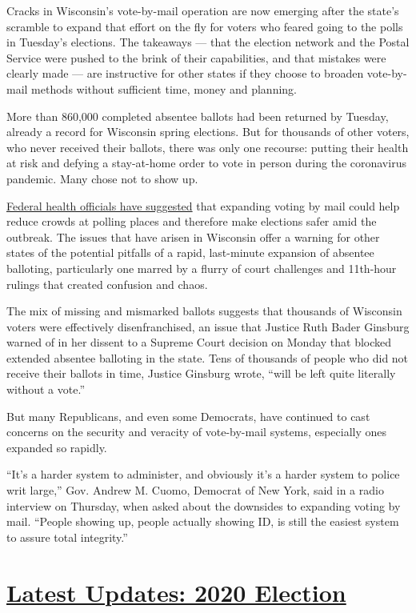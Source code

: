 Cracks in Wisconsin's vote-by-mail operation are now emerging after the
state's scramble to expand that effort on the fly for voters who feared
going to the polls in Tuesday's elections. The takeaways --- that the
election network and the Postal Service were pushed to the brink of
their capabilities, and that mistakes were clearly made --- are
instructive for other states if they choose to broaden vote-by-mail
methods without sufficient time, money and planning.

More than 860,000 completed absentee ballots had been returned by
Tuesday, already a record for Wisconsin spring elections. But for
thousands of other voters, who never received their ballots, there was
only one recourse: putting their health at risk and defying a
stay-at-home order to vote in person during the coronavirus pandemic.
Many chose not to show up.

\href{https://www.nytimes3xbfgragh.onion/2020/04/08/us/politics/republicans-vote-by-mail.html}{Federal
health officials have suggested} that expanding voting by mail could
help reduce crowds at polling places and therefore make elections safer
amid the outbreak. The issues that have arisen in Wisconsin offer a
warning for other states of the potential pitfalls of a rapid,
last-minute expansion of absentee balloting, particularly one marred by
a flurry of court challenges and 11th-hour rulings that created
confusion and chaos.

The mix of missing and mismarked ballots suggests that thousands of
Wisconsin voters were effectively disenfranchised, an issue that Justice
Ruth Bader Ginsburg warned of in her dissent to a Supreme Court decision
on Monday that blocked extended absentee balloting in the state. Tens of
thousands of people who did not receive their ballots in time, Justice
Ginsburg wrote, ``will be left quite literally without a vote.''

But many Republicans, and even some Democrats, have continued to cast
concerns on the security and veracity of vote-by-mail systems,
especially ones expanded so rapidly.

``It's a harder system to administer, and obviously it's a harder system
to police writ large,'' Gov. Andrew M. Cuomo, Democrat of New York, said
in a radio interview on Thursday, when asked about the downsides to
expanding voting by mail. ``People showing up, people actually showing
ID, is still the easiest system to assure total integrity.''

\hypertarget{latest-updates-2020-election}{%
\section{\texorpdfstring{\href{https://www.nytimes3xbfgragh.onion/live/2020/08/19/us/dnc-convention-election?action=click\&pgtype=Article\&state=default\&region=MAIN_CONTENT_1\&context=storylines_live_updates}{Latest
Updates: 2020
Election}}{Latest Updates: 2020 Election}}\label{latest-updates-2020-election}}

